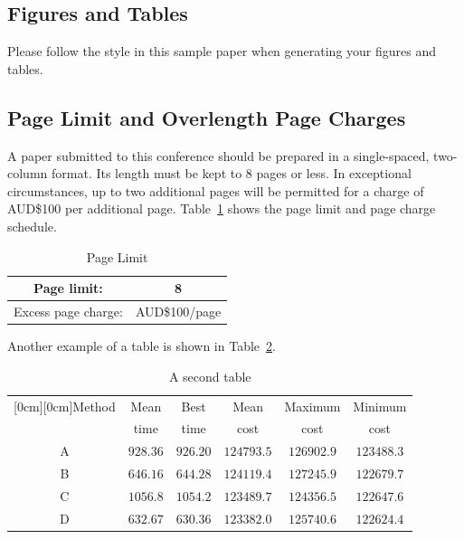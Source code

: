 \documentclass[conference]{IEEEtran}
\begin{document}
\subsection{Figures and Tables}
Please follow the style in this sample paper when generating your figures
and tables.

\subsection{Page Limit and Overlength Page Charges}
A paper submitted to this conference should be prepared in a
single-spaced, two-column format.  Its length must be kept to 8
pages or less.  In exceptional circumstances, up to two additional
pages will be permitted for a charge of AUD\$100 per additional page.
Table~\ref{table-tab1} shows the page limit and page charge schedule.

\begin{table}
\begin{center}
\renewcommand{\arraystretch}{1.3}
\caption{Page Limit}
\label{table-tab1}
\begin{tabular}{|c|c|}
\hline
Page limit: & 8\\
\hline
Excess page charge: & AUD\$100/page\\
\hline
\end{tabular}
\end{center}
\end{table}

Another example of a table is shown in Table~\ref{table-tab2}.

\begin{table}[h]
\caption{A second table}
\begin{center}
\begin{tabular}{|c|c|c|c|c|c|}
\hline
\multicolumn{1}{|c|}{\raisebox{-1.50ex}[0cm][0cm]{\!Method\!}}
& \multicolumn{1}{|c|}{Mean}
& \multicolumn{1}{|c|}{Best}
& \multicolumn{1}{|c|}{Mean}
& \multicolumn{1}{|c|}{Maximum}
& \multicolumn{1}{|c|}{Minimum} \\
& time & time & cost & cost & cost\\ \hline
A      &  $928.36$  &  $926.20$  &  $124793.5$ & $126902.9$ & $123488.3$ \\ \hline
B      &  $646.16$  &  $644.28$  &  $124119.4$ & $127245.9$ & $122679.7$ \\ \hline
C      &  $1056.8$  &  $1054.2$  &  $123489.7$ & $124356.5$ & $122647.6$ \\ \hline
D      &  $632.67$  &  $630.36$  &  $123382.0$ & $125740.6$ & $122624.4$ \\ \hline
\end{tabular}
\label{table-tab2}
\end{center}
\end{table}
\end{document}
